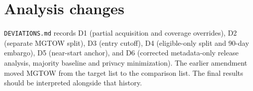 \documentclass[10pt,twocolumn]{article}
\begin{document}
\section{Analysis changes}
\texttt{DEVIATIONS.md} records D1 (partial acquisition and coverage overrides), D2 (separate MGTOW split), D3 (entry cutoff), D4 (eligible-only split and 90-day embargo), D5 (near-start anchor), and D6 (corrected metadata-only release analysis, majority baseline and privacy minimization). The earlier amendment moved MGTOW from the target list to the comparison list. The final results should be interpreted alongside that history.
\end{document}
